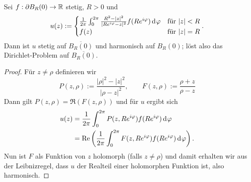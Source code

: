 \begin{thm}
  \label{thm:poisson}
  Sei $f: \partial B_R(0) \rightarrow \mathbb{R}$ stetig, $R > 0$ und
\begin{align*}
    u(z) :=
    \begin{cases}
      \frac{1}{2\pi} \int_0^{2\pi} \frac{R^2 - |z|^2}{|Re^{i\phi}
        - z|^2} f(R e^{i\phi}) \d[\phi] & \text{für } |z| < R\\
      f(z) & \text{für } |z| = R
    \end{cases}.
  \end{align*}
  Dann ist $u$ stetig auf $\overline{B_R(0)}$ und harmonisch auf $B_R(0)$;
  löst also das Dirichlet-Problem auf $\overline{B_R(0)}$.
\end{thm}

\begin{proof}
  Für $z \neq \rho$ definieren wir
  \[
  P(z, \rho) := \frac{|\rho|^2 - |z|^2}{|\rho - z|^2}, \qquad
  F(z,\rho) := \frac{\rho +z }{\rho - z}
  \]
  Dann gilt $P(z, \rho) = \Re(F(z, \rho))$ und für $u$ ergibt sich
  \begin{align*}
    u(z) & = \frac{1}{2\pi} \int_0^{2\pi} P(z, Re^{i\phi})
    f(Re^{i\phi}) \d[\phi] \\
    & = \Re \left ( \frac{1}{2\pi} \int_0^{2\pi} F(z, Re^{i\phi})
      f(Re^{i\phi}) \d[\phi] \right ).
  \end{align*}
  Nun ist $F$ als Funktion von $z$ holomorph (falls $z \neq \rho$)
  und damit erhalten wir aus der Leibnizregel, dass $u$ der Realteil
  einer holomorphen Funktion ist, also harmonisch.
  

\end{proof}
